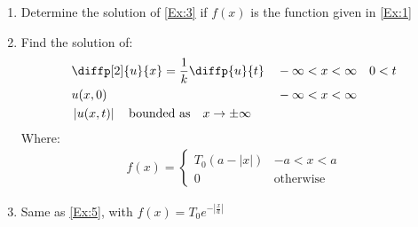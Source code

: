 \documentclass[12pt]{article}
\begin{document}
\begin{enumerate}
\begin{align*}
               & \diffp{u}{x}(0,t) = 0,                     &  &     &  & 0<t \\
               & u(x,0) = f(x)                              &  & 0<x
          \end{align*} \label{Ex:3}
          
    \item Determine the solution of \cref{Ex:3} if $f(x)$ is the function given in \cref{Ex:1}
          
    \item Find the solution of:
          \begin{align*}
               & \diffp[2]{u}{x}=\frac{1}{k} \diffp{u}{t}                                  &  & -\infty<x<\infty &  & 0<t \\
               & u(x,0)                                                                    &  & -\infty<x<\infty          \\
               & \left| u(x,t) \right| \quad \text{bounded as}\quad x\rightarrow \pm\infty
          \end{align*}
          Where:
          \begin{gather*}
              f(x)=\begin{cases}
                  T_{0}(a-\left| x \right|) & -a<x<a           \\
                  0                         & \text{otherwise}
              \end{cases}
          \end{gather*} \label{Ex:5}
          
    \item Same as \cref{Ex:5}, with $f(x)=T_{0}e^{-\left| \frac{x}{a} \right|}$
    
\end{enumerate}
\end{document}
